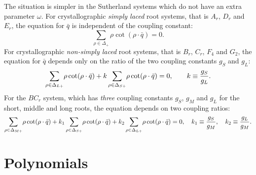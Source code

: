 \documentclass[a4paper,12pt]{article}
\begin{document}
The situation is simpler in the Sutherland systems which do not have an
extra parameter $\omega$. For crystallographic {\em simply laced\/}
root systems, that is $A_r$, $D_r$ and $E_r$, the equation for $\bar{q}$ is
independent of the coupling constant:
\begin{equation}
   \sum_{\rho\in\Delta_+}\!{\rho\cot(\rho\cdot\bar{q})}=0.
   \label{tsleq}
\end{equation}
For crystallographic {\em non-simply laced\/} root systems, that is
$B_r$, $C_r$, $F_4$ and $G_2$, the equation for $\bar{q}$ depends only
on the ratio of the two coupling constants $g_S$ and $g_L$:
\begin{equation}
   \sum_{\rho\in\Delta_{L+}}\!{\rho\cot(\rho\cdot\bar{q})}+
   k\sum_{\rho\in\Delta_{S+}}\!{\rho\cot(\rho\cdot\bar{q})}=0,
   \qquad k\equiv{g_S\over{g_L}}.
   \label{tnsleq}
\end{equation}
For the $BC_r$ system, which has {\em three\/} coupling constants
$g_S$, $g_M$ and $g_L$ for the short, middle and long roots,
the equation depends on two coupling ratios:
\begin{equation}
   \sum_{\rho\in\Delta_{M+}}\!{\rho\cot(\rho\cdot\bar{q})}+
   k_1\sum_{\rho\in\Delta_{S+}}\!{\rho\cot(\rho\cdot\bar{q})}+
   k_2\sum_{\rho\in\Delta_{L+}}\!{\rho\cot(\rho\cdot\bar{q})}=0,
   \quad k_1\equiv{g_S\over{g_M}}, \quad k_2\equiv{g_L\over{g_M}}.
   \label{tbcreq}
\end{equation}

\section{Polynomials}
\label{polydef}
\setcounter{equation}{0}
\end{document}
